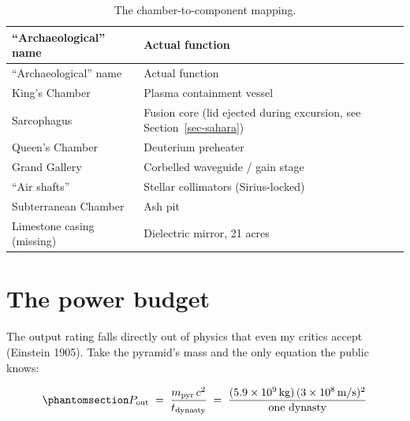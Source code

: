 \documentclass[
  english,
  11pt,
  letterpaper,
]{scrbook}
\begin{document}
\begin{longtable}[]{@{}
  >{\raggedright\arraybackslash}p{}
  >{\raggedright\arraybackslash}p{}@{}}
\caption{The chamber-to-component
mapping.}\label{tbl-chambers}\tabularnewline
\toprule\noalign{}
\begin{minipage}[b]{\linewidth}\raggedright
``Archaeological'' name
\end{minipage} & \begin{minipage}[b]{\linewidth}\raggedright
Actual function
\end{minipage} \\
\midrule\noalign{}
\endfirsthead
\toprule\noalign{}
\begin{minipage}[b]{\linewidth}\raggedright
``Archaeological'' name
\end{minipage} & \begin{minipage}[b]{\linewidth}\raggedright
Actual function
\end{minipage} \\
\midrule\noalign{}
\endhead
\bottomrule\noalign{}
\endlastfoot
King's Chamber & Plasma containment vessel \\
Sarcophagus & Fusion core (lid ejected during excursion, see
Section~\ref{sec-sahara}) \\
Queen's Chamber & Deuterium preheater \\
Grand Gallery & Corbelled waveguide / gain stage \\
``Air shafts'' & Stellar collimators (Sirius-locked) \\
Subterranean Chamber & Ash pit \\
Limestone casing (missing) & Dielectric mirror, 21 acres \\
\end{longtable}

\section{The power budget}\label{the-power-budget}

The output rating falls directly out of physics that even my critics
accept (Einstein 1905). Take the pyramid's mass and the only equation
the public knows:

\begin{equation}\protect\phantomsection\label{eq-power}{
P_{\text{out}} \;=\; \frac{m_{\text{pyr}}\,c^{2}}{t_{\text{dynasty}}}
\;=\; \frac{(5.9\times10^{9}\,\text{kg})\,(3\times10^{8}\,\text{m/s})^{2}}{\text{one dynasty}}
}\end{equation}
\end{document}

